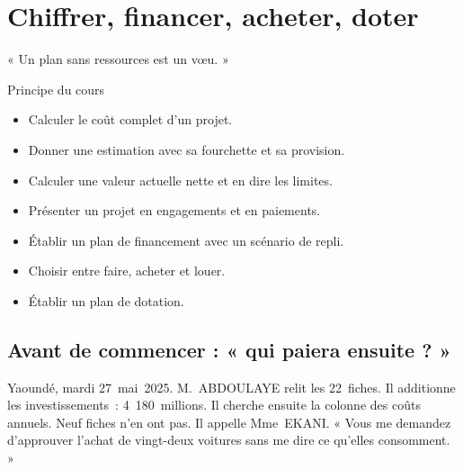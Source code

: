 
\chapter{Chiffrer, financer, acheter, doter}
\label{chap:financer}

\epigraph{%
    « Un plan sans ressources est un vœu. »%
}{Principe du cours}


\begin{boxobjectifs}
\begin{itemize}
    \item Calculer le coût complet d'un projet.
    \item Donner une estimation avec sa fourchette et sa provision.
    \item Calculer une valeur actuelle nette et en dire les limites.
    \item Présenter un projet en engagements et en paiements.
    \item Établir un plan de financement avec un scénario de repli.
    \item Choisir entre faire, acheter et louer.
    \item Établir un plan de dotation.
\end{itemize}
\end{boxobjectifs}

\bigskip

\section*{Avant de commencer : « qui paiera ensuite ? »}

Yaoundé, mardi 27~mai~2025. M.~ABDOULAYE relit les 22~fiches. Il additionne les investissements~: 4~180~millions.
Il cherche ensuite la colonne des coûts annuels. Neuf fiches n'en ont pas. Il appelle Mme~EKANI. « Vous me
demandez d'approuver l'achat de vingt-deux voitures sans me dire ce qu'elles consomment. »

